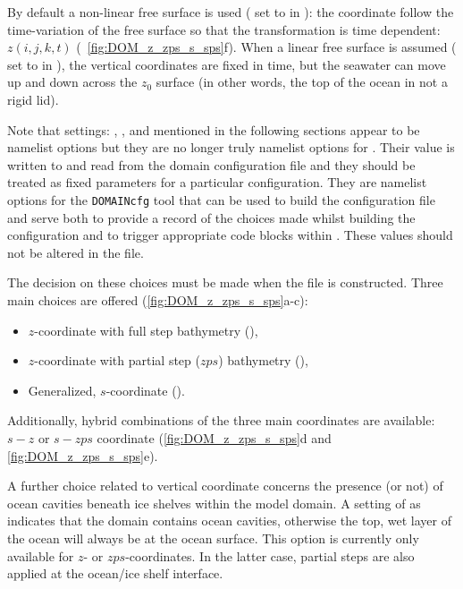 \documentclass[../main/NEMO_manual]{subfiles}
\begin{document}
By default a non-linear free surface is used
( set to  in ):
the coordinate follow the time-variation of the free surface so that
the transformation is time dependent: $z(i,j,k,t)$ (\eg\ \autoref{fig:DOM_z_zps_s_sps}f).
When a linear free surface is assumed
( set to  in ),
the vertical coordinates are fixed in time, but
the seawater can move up and down across the $z_0$ surface
(in other words, the top of the ocean in not a rigid lid).

Note that settings:
, ,  and 
mentioned in the following sections appear to be namelist options but
they are no longer truly namelist options for \NEMO.
Their value is written to and read from the domain configuration file and
they should be treated as fixed parameters for a particular configuration.
They are namelist options for the \texttt{DOMAINcfg} tool that can be used to
build the configuration file and serve both to provide a record of the choices made whilst
building the configuration and to trigger appropriate code blocks within \NEMO.
These values should not be altered in the  file.

\medskip
The decision on these choices must be made when the  file is constructed.
Three main choices are offered (\autoref{fig:DOM_z_zps_s_sps}a-c):

\begin{itemize}
\item $z$-coordinate with full step bathymetry (),
\item $z$-coordinate with partial step ($zps$) bathymetry (),
\item Generalized, $s$-coordinate ().
\end{itemize}

Additionally, hybrid combinations of the three main coordinates are available:
$s-z$ or $s-zps$ coordinate (\autoref{fig:DOM_z_zps_s_sps}d and \autoref{fig:DOM_z_zps_s_sps}e).

A further choice related to vertical coordinate concerns
the presence (or not) of ocean cavities beneath ice shelves within the model domain.
A setting of  as  indicates that
the domain contains ocean cavities,
otherwise the top, wet layer of the ocean will always be at the ocean surface.
This option is currently only available for $z$- or $zps$-coordinates.
In the latter case, partial steps are also applied at the ocean/ice shelf interface.
\end{document}
